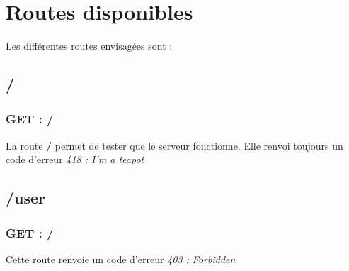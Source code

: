 \documentclass[12pt]{report}
\begin{document}
	\section{Routes disponibles}
	Les différentes routes envisagées sont :
	\subsection{/}
	\subsubsection{GET : /}
	La route \textbf{/} permet de tester que le serveur fonctionne. Elle renvoi toujours un code d'erreur \textit{418 : I'm a teapot}
	\subsection{/user}
	\subsubsection{GET : /}
	Cette route renvoie un code d'erreur \textit{403 : Forbidden}
\end{document}
